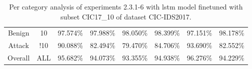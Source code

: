 \begin{table}[htb]
\begin{tabular}{@{}cccccccc@{}}
         \\
        Benign &  10 &  97.574\% &  97.988\% &  98.050\% &  98.399\% &  97.151\% &  98.178\% \\
        Attack &  !10 &  90.088\% &  82.494\% &  79.470\% &  84.706\% &  93.690\% &  82.552\% \\
        Overall &  ALL &  95.682\% &  94.073\% &  93.355\% &  94.938\% &  96.276\% &  94.229\% \\
        \bottomrule
    \end{tabular}
    \caption{Per category analysis of experiments 2.3.1-6 with \gls{lstm} model finetuned with subset CIC17\_10 of dataset CIC-IDS2017.}
    \label{table:results:lstm:class_flows_subset}
\end{table}